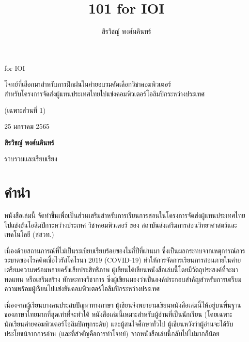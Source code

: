 \documentclass[12pt]{octavo}
\title{101 for IOI}
\author{สิรวิชญ์ พงศ์นคินทร์}
\date{}
\begin{document}
\thispagestyle{titlepage}

\vspace*{\fill}

\begin{center}
{
    \noindent\sffamily
    {\Huge{} for IOI}
    
    \medskip
    
    โจทย์ที่เลือกมาสำหรับการฝึกฝนในค่ายอบรมคัดเลือกวิชาคอมพิวเตอร์\\
    สำหรับโครงการจัดส่งผู้แทนประเทศไทยไปแข่งคอมพิวเตอร์โอลิมปิกระหว่างประเทศ
    
    \bigskip
    
    (เฉพาะส่วนที่ 1)
    
    \vspace{2cm}
    
    25 มกราคม 2565
    
    \vspace{3cm}
    
    \textbf{สิรวิชญ์ พงศ์นคินทร์}
    
    รวบรวมและเรียบเรียง
}
\end{center}

\vspace*{\fill}

\newpage

\chapter*{คำนำ}

หนังสือเล่มนี้ จัดทำขึ้นเพื่อเป็นส่วนเสริมสำหรับการเรียนการสอนในโครงการจัดส่งผู้แทนประเทศไทยไปแข่งขันโอลิมปิกระหว่างประเทศ วิชาคอมพิวเตอร์ ของ สถาบันส่งเสริมการสอนวิทยาศาสตร์และเทคโนโลยี (สสวท.)

เนื่องด้วยสถานการณ์ที่ไม่เป็นระเบียบเรียบร้อยของไม่กี่ปีที่ผ่านมา ซึ่งเป็นผลกระทบจากเหตุการณ์การระบาดของโรคติดเชื้อไวรัสโคโรนา 2019 (COVID-19) ทำให้การจัดการเรียนการสอนภายในค่ายเตรียมความพร้อมหลายครั้งเสียประสิทธิภาพ ผู้เขียนได้เขียนหนังสือเล่มนี้โดยมีวัตถุประสงค์ที่จะมาทดแทน หรือเสริมสร้าง ทักษะทางวิชาการ ซึ่งผู้เขียนมองว่าเป็นองค์ประกอบสำคัญสำหรับการเตรียมความพร้อมผู้เรียนไปแข่งขันคอมพิวเตอร์โอลิมปิกระหว่างประเทศ

เนื่องจากผู้เรียนบางคนประสบปัญหาทางภาษา ผู้เขียนจึงพยายามเขียนหนังสือเล่มนี้ให้อยู่บนพื้นฐานของภาษาไทยมากที่สุดเท่าที่จะทำได้ หนังสือเล่มนี้เหมาะสำหรับผู้อ่านที่เป็นนักเรียน (โดยเฉพาะนักเรียนค่ายคอมพิวเตอร์โอลิมปิกทุกระดับ) และผู้สนใจศึกษาทั่วไป ผู้เขียนหวังว่าผู้อ่านจะได้รับประโยชน์จากการอ่าน (และที่สำคัญคือการทำโจทย์) จากหนังสือเล่มนี้กลับไปไม่มากก็น้อย
\end{document}
